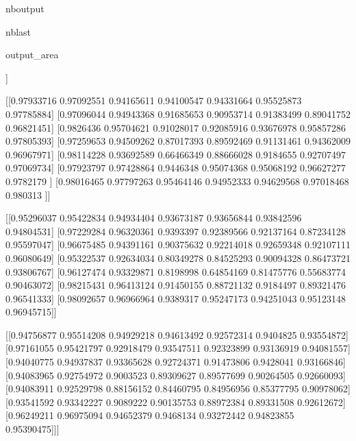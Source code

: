 \documentclass[letterpaper,10pt,english]{sphinxmanual}
\begin{document}
\begin{sphinxuseclass}{nboutput}
\begin{sphinxuseclass}{nblast}
{\begin{sphinxuseclass}{output_area}
\begin{sphinxuseclass}{}
\begin{sphinxVerbatim}[commandchars=\\\{\}]
 [[0.98496985 0.96739489 0.9302929  0.89807343 0.9174937  0.95895547
   0.98020232]
  [0.98125023 0.94733357 0.86565912 0.84225869 0.8774448  0.95282722
   0.98152596]
  [0.97424239 0.93394589 0.72031593 0.88447887 0.90997893 0.9595657
   0.9761579 ]
  [0.97994757 0.96309948 0.90736842 0.8934654  0.89512074 0.94767475
   0.97867441]
  [0.98629206 0.97525859 0.95201224 0.88435513 0.7504518  0.91819239
   0.98110867]
  [0.98893738 0.98108053 0.96626729 0.94061965 0.93254912 0.95972735
   0.97235537]
  [0.98517865 0.97681737 0.96344769 0.95575136 0.95711577 0.96942037
   0.9815892 ]]

 [[0.97933716 0.97092551 0.94165611 0.94100547 0.94331664 0.95525873
   0.97785884]
  [0.97096044 0.94943368 0.91685653 0.90953714 0.91383499 0.89041752
   0.96821451]
  [0.9826436  0.95704621 0.91028017 0.92085916 0.93676978 0.95857286
   0.97805393]
  [0.97259653 0.94509262 0.87017393 0.89592469 0.91131461 0.94362009
   0.96967971]
  [0.98114228 0.93692589 0.66466349 0.88666028 0.9184655  0.92707497
   0.97069734]
  [0.97923797 0.97428864 0.9446348  0.95074368 0.95068192 0.96627277
   0.9782179 ]
  [0.98016465 0.97797263 0.95464146 0.94952333 0.94629568 0.97018468
   0.980313  ]]

 [[0.95296037 0.95422834 0.94934404 0.93673187 0.93656844 0.93842596
   0.94804531]
  [0.97229284 0.96320361 0.9393397  0.92389566 0.92137164 0.87234128
   0.95597047]
  [0.96675485 0.94391161 0.90375632 0.92214018 0.92659348 0.92107111
   0.96080649]
  [0.95322537 0.92634034 0.80349278 0.84525293 0.90094328 0.86473721
   0.93806767]
  [0.96127474 0.93329871 0.8198998  0.64854169 0.81475776 0.55683774
   0.90463072]
  [0.98215431 0.96413124 0.91450155 0.88721132 0.9184497  0.89321476
   0.96541333]
  [0.98092657 0.96966964 0.9389317  0.95247173 0.94251043 0.95123148
   0.96945715]]

 [[0.94756877 0.95514208 0.94929218 0.94613492 0.92572314 0.9404825
   0.93554872]
  [0.97161055 0.95421797 0.92918479 0.93547511 0.92323899 0.93136919
   0.94081557]
  [0.94040775 0.94937837 0.93365628 0.92724371 0.91473806 0.9428041
   0.93166846]
  [0.94083965 0.92754972 0.9003523  0.89309627 0.89577699 0.90264505
   0.92660093]
  [0.94083911 0.92529798 0.88156152 0.84460795 0.84956956 0.85377795
   0.90978062]
  [0.93541592 0.93342227 0.9089222  0.90135753 0.88972384 0.89331508
   0.92612672]
  [0.96249211 0.96975094 0.94652379 0.9468134  0.93272442 0.94823855
   0.95390475]]]
\end{sphinxVerbatim}



\end{sphinxuseclass}
\end{sphinxuseclass}
}

\end{sphinxuseclass}
\end{sphinxuseclass}
\end{document}

